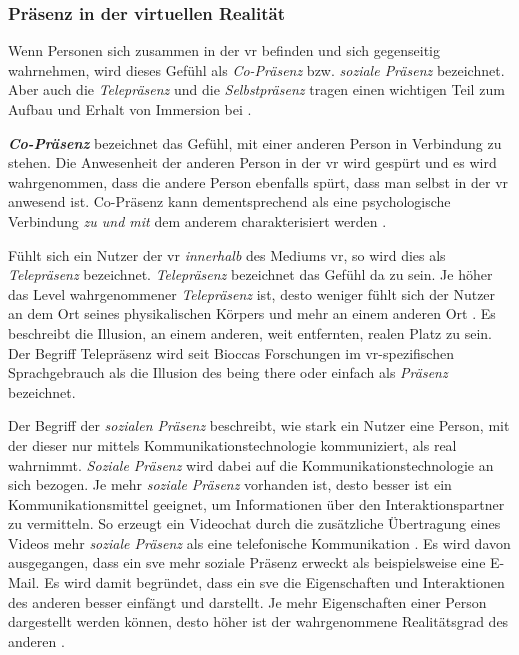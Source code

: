 \documentclass[a4paper,11pt]{article}%
\renewcommand{\\}{\vspace*{0.5\baselineskip} \newline}
\begin{document}
		\subsubsection{Präsenz in der virtuellen Realität}
Wenn Personen sich zusammen in der \ac{vr} befinden und sich gegenseitig wahrnehmen, wird dieses Gefühl als \textit{Co-Präsenz} bzw. \textit{soziale Präsenz} bezeichnet. Aber auch die \textit{Telepräsenz} und die \textit{Selbstpräsenz} tragen einen wichtigen Teil zum Aufbau und Erhalt von Immersion bei \citep{schuemie2001research}.

\textbf{\textit{Co-Präsenz}} bezeichnet das Gefühl, mit einer anderen Person in Verbindung zu stehen.
Die Anwesenheit der anderen Person in der \ac{vr} wird gespürt und es wird wahrgenommen, dass die andere Person ebenfalls spürt, dass man selbst in der \ac{vr} anwesend ist. 
Co-Präsenz kann dementsprechend als eine psychologische Verbindung \textit{zu und mit} dem anderem charakterisiert werden \citep[179-182]{ijsselsteijn2001presence}.

Fühlt sich ein Nutzer der \ac{vr} \textit{innerhalb} des Mediums \ac{vr}, so wird dies als \textit{Telepräsenz} bezeichnet. \textit{Telepräsenz} bezeichnet das Gefühl \glqq{}da zu sein\dq{}. Je höher das Level wahrgenommener \textit{Telepräsenz} ist, desto weniger fühlt sich der Nutzer an dem Ort seines physikalischen Körpers und mehr an einem anderen Ort \citep[S. 482]{nowak2003effect}. Es beschreibt die Illusion, an einem anderen, weit entfernten, realen Platz zu sein. Der Begriff Telepräsenz wird seit Bioccas Forschungen \cite[p.12]{biocca1999cyborg} im \ac{vr}-spezifischen Sprachgebrauch als die Illusion des \glqq{}being there\dq{} oder einfach als \textit{Präsenz} bezeichnet.

Der Begriff der \textit{sozialen Präsenz} beschreibt, wie stark ein Nutzer eine Person, mit der dieser nur mittels Kommunikationstechnologie kommuniziert, als \glqq{}real\dq{} wahrnimmt. \textit{Soziale Präsenz} wird dabei auf die Kommunikationstechnologie an sich bezogen. Je mehr \textit{soziale Präsenz} vorhanden ist, desto besser ist ein Kommunikationsmittel geeignet, um Informationen über den Interaktionspartner zu vermitteln. So erzeugt ein Videochat durch die zusätzliche Übertragung eines Videos mehr \textit{soziale Präsenz} als eine telefonische Kommunikation \citep[S. 151]{gunawardena1995social}.
Es wird davon ausgegangen, dass ein \ac{sve} mehr soziale Präsenz erweckt als beispielsweise eine E-Mail. Es wird damit begründet, dass ein \ac{sve} die Eigenschaften und Interaktionen des anderen besser einfängt und darstellt. Je mehr Eigenschaften einer Person dargestellt werden können, desto höher ist der wahrgenommene Realitätsgrad des anderen \citep[S. 5-8]{biocca2002defining}.
\end{document}
